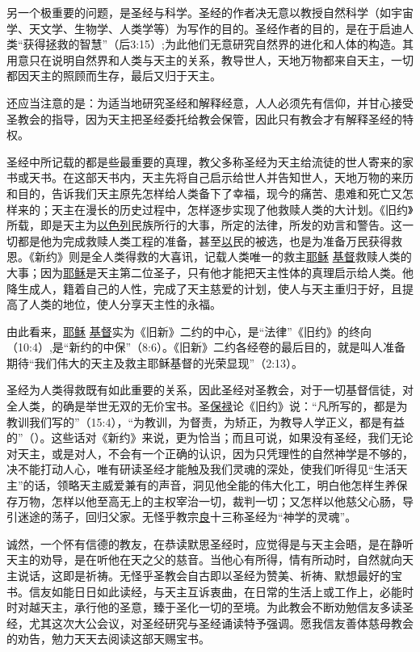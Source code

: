 另一个极重要的问题，是圣经与科学。圣经的作者决无意以教授自然科学（如宇宙学、天文学、生物学、人类学等）为写作的目的。圣经作者的目的，是在于启迪人类“获得拯救的智慧”（后3:15）;为此他们无意研究自然界的进化和人体的构造。其用意只在说明自然界和人类与天主的关系，教导世人，天地万物都来自天主，一切都因天主的照顾而生存，最后又归于天主。

还应当注意的是：为适当地研究圣经和解释经意，人人必须先有信仰，并甘心接受圣教会的指导，因为天主把圣经委托给教会保管，因此只有教会才有解释圣经的特权。

圣经中所记载的都是些最重要的真理，教父多称圣经为天主给流徒的世人寄来的家书或天书。在这部天书内，天主先将自己启示给世人并告知世人，天地万物的来历和目的，告诉我们天主原先怎样给人类备下了幸福，现今的痛苦、患难和死亡又怎样来的；天主在漫长的历史过程中，怎样逐步实现了他救赎人类的大计划。《旧约》所载，即是天主为\uline{以色列}民族所行的大事，所定的法律，所发的劝言和警告。这一切都是他为完成救赎人类工程的准备，甚至\uline{以}民的被选，也是为准备万民获得救恩。《新约》则是全人类得救的大喜讯，记载人类唯一的救主\uline{耶稣} \uline{基督}救赎人类的大事；因为\uline{耶稣}是天主第二位圣子，只有他才能把天主性体的真理启示给人类。他降生成人，籍着自己的人性，完成了天主慈爱的计划，使人与天主重归于好，且提高了人类的地位，使人分享天主性的永福。

由此看来，\uline{耶稣} \uline{基督}实为《旧新》二约的中心，是“法律”《旧约》的终向（10:4）,是“新约的中保”（8:6）。《旧新》二约各经卷的最后目的，就是叫人准备期待“我们伟大的天主及救主耶稣基督的光荣显现”（2:13）。

圣经为人类得救既有如此重要的关系，因此圣经对圣教会，对于一切基督信徒，对全人类，的确是举世无双的无价宝书。圣\uline{保禄}论《旧约》说：“凡所写的，都是为教训我们写的”（15:4），“为教训，为督责，为矫正，为教导人学正义，都是有益的”（）。这些话对《新约》来说，更为恰当；而且可说，如果没有圣经，我们无论对天主，或是对人，不会有一个正确的认识，因为只凭理性的自然神学是不够的，决不能打动人心，唯有研读圣经才能触及我们灵魂的深处，使我们听得见“生活天主”的话，领略天主威爱兼有的声音，洞见他全能的伟大化工，明白他怎样生养保存万物，怎样以他至高无上的主权宰治一切，裁判一切；又怎样以他慈父心肠，导引迷途的荡子，回归父家。无怪乎教宗\uline{良}十三称圣经为“神学的灵魂”。

诚然，一个怀有信德的教友，在恭读默思圣经时，应觉得是与天主会晤，是在静听天主的劝导，是在听他在天之父的慈音。当他心有所得，情有所动时，自然就向天主说话，这即是祈祷。无怪乎圣教会自古即以圣经为赞美、祈祷、默想最好的宝书。信友如能日日如此读经，与天主互诉衷曲，在日常的生活上或工作上，必能时时对越天主，承行他的圣意，臻于圣化一切的至境。为此教会不断劝勉信友多读圣经，尤其这次大公会议，对圣经研究与圣经诵读特予强调。愿我信友善体慈母教会的劝告，勉力天天去阅读这部天赐宝书。